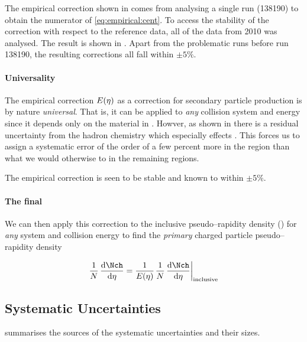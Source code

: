 The empirical correction shown in  comes
from analysing a single run (138190) to obtain the numerator of
\eqref{eq:empirical:cent}.  To access the stability of the correction
with respect to the reference data, all of the \PbPbCol{} data from
2010 was analysed.  The result is shown in
.  Apart from the problematic runs
before run 138190, the resulting corrections all fall within
$\pm5\%$. 


\paragraph{Universality} The empirical correction $\EmpCor$ as a
correction for secondary particle production is by nature
\emph{universal}.  That is, it can be applied to \emph{any} collision
system and energy since it depends only on the material in \ALICE{}.
Howver, as shown in  there is a residual
uncertainty from the hadron chemistry which especially effects
.  This forces us to assign a systematic error of the order of
a few percent more in the  region than what we would otherwise
to in the remaining regions. 


The empirical correction is seen to be stable and known to within
$\pm5\%$.  


\paragraph{The final \ndndeta{}}
We can then apply this correction to the inclusive pseudo--rapidity
density (\indndeta{}) for \emph{any} system and collision energy to
find the \emph{primary} charged particle pseudo--rapidity density

\begin{equation}
  \label{eq:empirical:applied}
  \ndndeta = \frac{1}{\EmpCor{}} \indndeta{}
\end{equation}

\subsection{Systematic Uncertainties}
\label{sec:sub:dndeta:syserr}

 summarises the sources of the systematic
uncertainties and their sizes.


